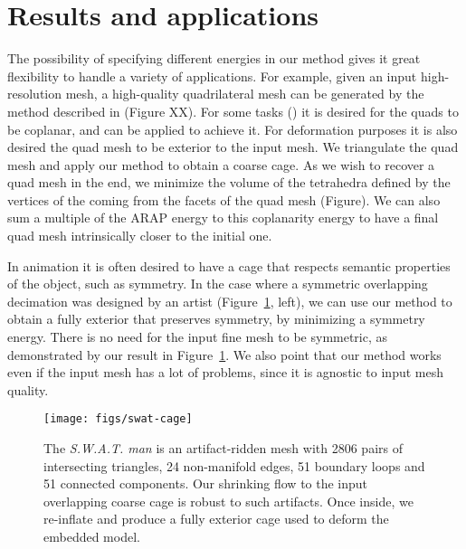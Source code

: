 \section{Results and applications}
\label{sec:results}



The possibility of specifying different energies in our method
gives it great flexibility to handle a variety of applications. For example,
given an input high-resolution mesh,
a high-quality quadrilateral mesh can be generated by
the method described in \cite{Takayama:2013} (Figure XX). For some tasks
() it is desired for the quads to be coplanar,
and  can be applied to achieve it.
For deformation purposes it is also desired the quad mesh to be exterior to the input mesh. 
We triangulate the quad mesh and apply our method to obtain a
coarse cage. As we wish to recover a quad mesh in the end, we minimize
the volume of the tetrahedra defined by the vertices of the coming from 
the facets of the quad mesh (Figure).
We can also sum a multiple of the ARAP energy to this coplanarity energy
to have a final quad mesh intrinsically closer to the initial one.

In animation it is often desired to have a cage that respects semantic
properties of the object, such as symmetry. In the case where a symmetric overlapping
decimation was designed by an artist (Figure~\ref{fig:swat-cage}, left), we can use our method 
to obtain a fully exterior that preserves symmetry, by minimizing a symmetry energy. 
There is no need for the input fine mesh to be symmetric, as demonstrated
by our result in Figure~\ref{fig:swat-cage}. We also point that our method works
even if the input mesh has a lot of problems, since it is agnostic to input mesh quality.

\begin{figure}
  \texttt{[image: figs/swat-cage]}
  \caption{The \emph{S.W.A.T. man} is an artifact-ridden mesh with 2806 pairs
  of intersecting triangles, 24 non-manifold edges, 51 boundary loops and 51
  connected components. Our shrinking flow to the input overlapping coarse cage
  is robust to such artifacts. Once inside, we re-inflate and produce a fully
  exterior cage used to deform the embedded model.}
  \label{fig:swat-cage}
\end{figure}

